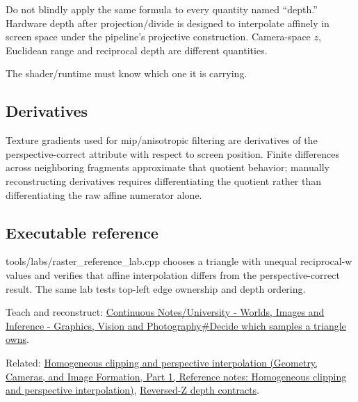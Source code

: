 \hypertarget{appendix-1ed5f96c73ea-depth-is-a-separate-contract}{}

Do not blindly apply the same formula to every quantity named ``depth.'' Hardware depth after projection/divide is designed to interpolate affinely in screen space under the pipeline's projective construction. Camera-space \(z\), Euclidean range and reciprocal depth are different quantities.

The shader/runtime must know which one it is carrying.

\subsection{Derivatives}\label{appendix-1ed5f96c73ea-derivatives}

\hypertarget{appendix-1ed5f96c73ea-derivatives}{}

Texture gradients used for mip/anisotropic filtering are derivatives of the perspective-correct attribute with respect to screen position. Finite differences across neighboring fragments approximate that quotient behavior; manually reconstructing derivatives requires differentiating the quotient rather than differentiating the raw affine numerator alone.

\subsection{Executable reference}\label{appendix-1ed5f96c73ea-executable-reference}

\hypertarget{appendix-1ed5f96c73ea-executable-reference}{}

tools/labs/raster\_reference\_lab.cpp chooses a triangle with unequal reciprocal-w values and verifies that affine interpolation differs from the perspective-correct result. The same lab tests top-left edge ownership and depth ordering.

Teach and reconstruct: \hyperref[03-visual-computing-i-ch012-decide-which-samples-a-triangle-owns]{Continuous Notes/University - Worlds, Images and Inference - Graphics, Vision and Photography\#Decide which samples a triangle owns}.

Related: \href{../03-Geometry-Cameras-and-Image-Formation-P01/main.pdf\#nameddest=appendix-40426e4b2103}{Homogeneous clipping and perspective interpolation (Geometry, Cameras, and Image Formation, Part 1, Reference notes: Homogeneous clipping and perspective interpolation)}, \hyperref[appendix-275ec8847057]{Reversed-Z depth contracts}.
